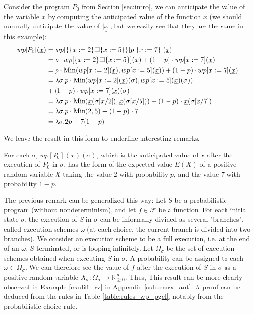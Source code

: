 \documentclass[a4paper,10pt]{llncs}
\def\RRposi {{\mathbb R_{\geq 0}^{\infty}}}
\def\Min {\textnormal {Min}}
\begin{document}
\begin{example} Consider the program $P_0$ from Section \ref{sec:intro}, we can anticipate the value of the variable $x$ by computing the anticipated value of the function $\underline{x}$ (we should normally anticipate the value of $\underline{|x|}$, but we easily see that they are the same in this example):
\begin{align*}
wp[P_0](\underline{x}) &= wp[ \{ \{x := 2\} \square \{x := 5\} \} [p] \{ x := 7 \} ](\underline{x}) \\
&= p\cdot wp[ \{x := 2\} \square \{x := 5\} ](x) + (1-p)\cdot wp[x := 7](\underline{x}) \\
&= p\cdot\Min(wp[x := 2](\underline{x}),wp[x := 5](\underline{x})) + (1-p)\cdot wp[x := 7](\underline{x}) \\
&= \lambda\sigma. p\cdot\Min(wp[x := 2](\underline{x})(\sigma),wp[x := 5](\underline{x})(\sigma))\\ & + (1-p)\cdot wp[x := 7](\underline{x})(\sigma) \\
&= \lambda\sigma. p\cdot\Min(\underline{x}(\sigma[x/2]),\underline{x}(\sigma[x/5])) + (1-p)\cdot \underline{x}(\sigma[x/7]) \\
&= \lambda\sigma. p\cdot\Min(2,5) + (1-p)\cdot 7 \\
&= \lambda\sigma. 2p+7(1-p)
\end{align*}
\end{example}
We leave the result in this form to underline interesting remarks.

\begin{remark}
For each $\sigma$, $wp[P_0](\underline{x})(\sigma)$, which is the anticipated value of $x$ after the execution of $P_0$ in $\sigma$, has the form of the expected value $E(X)$ of a positive random variable $X$ taking the value $2$ with probability $p$, and the value $7$ with probability $1-p$.
\end{remark}

\begin{remark}
The previous remark can be generalized this way:
Let $S$ be a probabilistic program (without nondeterminism), and let $f \in \mathcal{F}$ be a function. For each initial state $\sigma$, the execution of $S$ in $\sigma$ can be informally divided as several "branches", called execution schemes $\omega$ (at each choice, the current branch is divided into two branches).\newline
We consider an execution scheme to be a full execution, i.e. at the end of an $\omega$, $S$ terminated, or is looping infinitely. Let $\Omega_\sigma$ be the set of execution schemes obtained when executing $S$ in $\sigma$. A probability can be assigned to each $\omega \in \Omega_\sigma$. We can therefore see the value of $f$ after the execution of $S$ in $\sigma$ as a positive random variable $X_\sigma : \Omega_\sigma \rightarrow \RRposi$.\newline
Thus, 
This result can be more clearly observed in Example \ref{ex:diff_rv} in Appendix \ref{subsec:ex_ant}. A proof can be deduced from the rules in Table \ref{table:rules_wp_pgcl}, notably from the probabilistic choice rule.
\end{remark}
\end{document}
